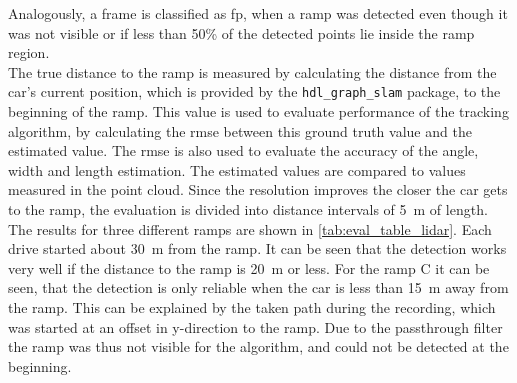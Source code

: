 Analogously, a frame is classified as \gls{fp}, when a ramp was detected even though it was not visible or if less than 50\% of the detected points lie inside the ramp region.\\
The true distance to the ramp is measured by calculating the distance from the car's current position, which is provided by the \texttt{hdl\_graph\_slam} package, to the beginning of the ramp.
This value is used to evaluate performance of the tracking algorithm, by calculating the \gls{rmse} between this ground truth value and the estimated value.
The \gls{rmse} is also used to evaluate the accuracy of the angle, width and length estimation.
The estimated values are compared to values measured in the point cloud.
Since the resolution improves the closer the car gets to the ramp, the evaluation is divided into distance intervals of \SI{5}{\metre} of length.\\
The results for three different ramps are shown in \cref{tab:eval_table_lidar}.
Each drive started about \SI{30}{\metre} from the ramp.
It can be seen that the detection works very well if the distance to the ramp is \SI{20}{\metre} or less.
For the ramp C it can be seen, that the detection is only reliable when the car is less than \SI{15}{\metre} away from the ramp.
This can be explained by the taken path during the recording, which was started at an offset in y-direction to the ramp.
Due to the passthrough filter the ramp was thus not visible for the algorithm, and could not be detected at the beginning.\\

